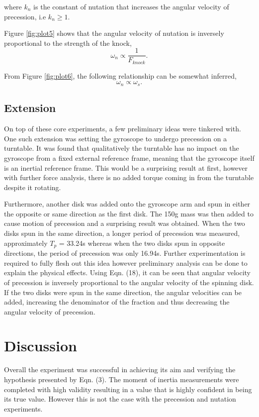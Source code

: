 \documentclass{article}
\begin{document}
where $k_n$ is the constant of nutation that increases the angular velocity of precession, 
i.e $k_n \geq 1.$

Figure \ref{fig:plot5} shows that the angular velocity of nutation is inversely
proportional to the strength of the knock,
\begin{equation}
    \omega_n \propto \frac{1}{F_{knock}}.
\end{equation}

From Figure \ref{fig:plot6}, the following relationship can be somewhat inferred,
\begin{equation}
    \omega_n \propto \omega_s.
\end{equation}

\subsection{Extension}
On top of these core experiments, a few preliminary ideas were tinkered with. One such extension 
was setting the gyroscope to undergo precession on a turntable. It was found that qualitatively
the turntable has no impact on the gyroscope from a fixed external reference frame, meaning that
the gyroscope itself is an inertial reference frame. This would be a surprising result at first,
however with further force analysis, there is no added torque coming in from the turntable despite
it rotating.

Furthermore, another disk was added onto the gyroscope arm and spun in either the opposite or same 
direction as the first disk. The 150g mass was then added to cause motion of precession and a 
surprising result was obtained. When the two disks spun in the same direction, a longer period
of precession was measured, approximately $T_p$ = 33.24s whereas when the two disks spun in 
opposite directions, the period of precession was only 16.94s. Further experimentation is required
to fully flesh out this idea however preliminary analysis can be done to explain the physical effects.
Using Eqn. (18), it can be seen that angular velocity of precession is inversely proportional to the
angular velocity of the spinning disk. If the two disks were spun in the same direction, the angular
velocities can be added, increasing the denominator of the fraction and thus decreasing the angular
velocity of precession.

\section{Discussion}
Overall the experiment was successful in achieving its aim and verifying the hypothesis 
presented by Eqn. (3). The moment of inertia measurements were completed with high validity
resulting in a value that is highly confident in being its true value. However this is not 
the case with the precession and nutation experiments. 
\end{document}

